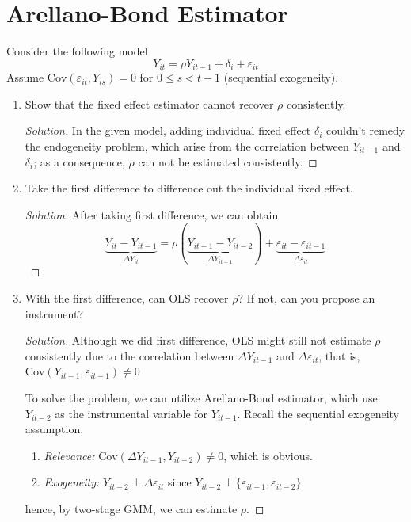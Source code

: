 \documentclass[11pt]{article}
\newenvironment{solution}{%
  \renewcommand\qedsymbol{$\blacksquare$}%
  \begin{mdframed}[backgroundcolor=gray!15]%
  \begin{proof}[Solution]}%
  {\end{proof}%
  \end{mdframed}}%
\newcommand{\cov}{\text{Cov}}
\begin{document}
\section{Arellano-Bond Estimator}

    Consider the following model
    \[ 
        Y_{it} = \rho Y_{it-1} + \delta_i + \varepsilon_{it} 
    \]
    Assume \( \text{Cov}(\varepsilon_{it}, Y_{is}) = 0 \) for \( 0 \leq s < t-1 \) (sequential exogeneity).

    \begin{enumerate}

        \item Show that the fixed effect estimator cannot recover \( \rho \) consistently.
        
            \begin{solution}
                In the given model, adding individual fixed effect $\delta_i$ couldn't remedy the endogeneity problem, which arise from the correlation between $Y_{it-1}$ and $\delta_i$; as a consequence, $\rho$ can not be estimated consistently.
            \end{solution}
            
        
        \item Take the first difference to difference out the individual fixed effect.
        
            \begin{solution}
                After taking first difference, we can obtain
                \[
                    \underbrace{Y_{it} - Y_{it-1}}_{\Delta Y_{it}} = \rho(\underbrace{Y_{it-1} - Y_{it-2}}_{\Delta Y_{it-1}}) + \underbrace{\varepsilon_{it} - \varepsilon_{it-1}}_{\Delta \varepsilon_{it}}
                \]
            \end{solution}
        
        \item With the first difference, can OLS recover \( \rho \)? If not, can you propose an instrument?
            
            \begin{solution}
                Although we did first difference, OLS might still not estimate $\rho$ consistently due to the correlation between $\Delta Y_{it-1}$ and $\Delta \varepsilon_{it}$, that is, $\cov(Y_{it-1}, \varepsilon_{it-1}) \neq 0$

                To solve the problem, we can utilize Arellano-Bond estimator, which use $Y_{it-2}$ as the instrumental variable for $Y_{it-1}$. Recall the sequential exogeneity assumption, 
                \begin{enumerate}
                    \item {\it Relevance:} $\cov(\Delta Y_{it-1}, Y_{it-2}) \neq 0$, which is obvious.
                    \item {\it Exogeneity:} $Y_{it-2} \perp \Delta\varepsilon_{it}$ since $Y_{it-2} \perp \{\varepsilon_{it-1},\varepsilon_{it-2}\}$
                \end{enumerate}
                hence, by two-stage GMM, we can estimate $\rho$.
            \end{solution}


\end{enumerate}
\end{document}
